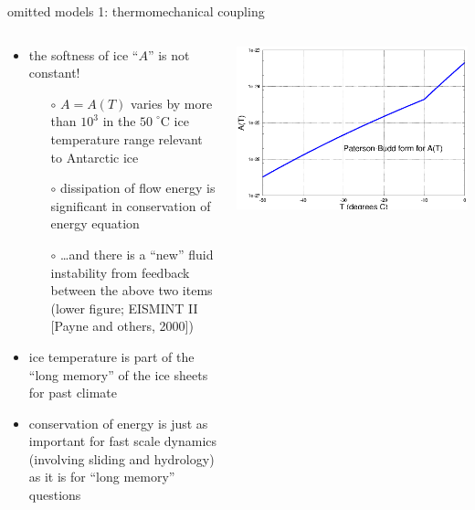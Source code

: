 \begin{frame}{omitted models 1: thermomechanical coupling}

\begin{columns}
\begin{column}{0.6\textwidth}
\begin{itemize}
\item the softness of ice ``$A$'' is not constant!
  \begin{itemize}
  \item[$\circ$] $A=A(T)$ varies by more than $10^3$ in the $50\phantom{|}^\circ\text{C}$ ice temperature range relevant to Antarctic ice
  \item[$\circ$] dissipation of flow energy is significant in conservation of energy equation
  \item[$\circ$] \dots and there is a ``new'' fluid instability from feedback between the above two items \scriptsize (lower figure; EISMINT II [Payne and others, 2000]\nocite{EISMINT00}) \small
  \end{itemize}
\item ice temperature is part of the ``long memory'' of the ice sheets for past climate
\item conservation of energy is just as important for fast scale dynamics (involving sliding and hydrology) as it is for ``long memory'' questions
\end{itemize}
\end{column}
\begin{column}{0.4\textwidth}
\vspace{-0.2in}
  \includegraphics[width=1.0\textwidth]{pdffigs/AofT}
  

\end{column}
\end{columns}
\end{frame}
